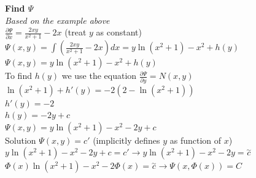 \documentclass{article}
\begin{document}
\textbf{Find $\Psi$}\\
\textit{Based on the example above}\\
$\frac{\partial\Psi}{\partial x}=\frac{2xy}{x^2+1}-2x$ (treat $y$ as constant)\\
$\Psi(x,y)=\int(\frac{2xy}{x^2+1}-2x)dx=y\ln(x^2+1)-x^2+h(y)$\\
$\Psi(x,y)=y\ln(x^2+1)-x^2+h(y)$\\
To find $h(y)$ we use the equation $\frac{\partial\Psi}{\partial y}=N(x,y)$\\
$\ln(x^2+1)+h'(y)=-2(2-\ln(x^2+1))$\\
$h'(y)=-2$\\
$h(y)=-2y+c$\\
$\Psi(x,y)=y\ln(x^2+1)-x^2-2y+c$\\
Solution $\Psi(x,y)=c'$ (implicitly defines $y$ as function of $x$)\\
$y\ln(x^2+1)-x^2-2y+c=c'\rightarrow y\ln(x^2+1)-x^2-2y=\overset{\sim}{c}$\\
$\Phi(x)\ln(x^2+1)-x^2-2\Phi(x)=\overset{\sim}{c}\rightarrow \Psi(x,\Phi(x))=C$
\end{document}
